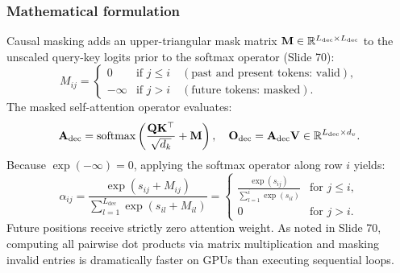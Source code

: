 \documentclass[../../main.tex]{subfiles}
\begin{document}
\subsubsection{Mathematical formulation}
Causal masking adds an upper-triangular mask matrix $\mathbf{M} \in \mathbb{R}^{L_{\text{dec}} \times L_{\text{dec}}}$ to the unscaled query-key logits prior to the softmax operator (Slide 70):
\begin{equation}
\label{eq:causal_mask_matrix_def}
M_{ij} = \begin{cases}
0 & \text{if } j \le i \quad (\text{past and present tokens: valid}), \\
-\infty & \text{if } j > i \quad (\text{future tokens: masked}).
\end{cases}
\end{equation}
The masked self-attention operator evaluates:
\begin{equation}
\label{eq:masked_attention_formula}
\mathbf{A}_{\text{dec}} = \operatorname{\mathrm{softmax}}\left( \frac{\mathbf{Q} \mathbf{K}^\top}{\sqrt{d_k}} + \mathbf{M} \right), \quad \mathbf{O}_{\text{dec}} = \mathbf{A}_{\text{dec}} \mathbf{V} \in \mathbb{R}^{L_{\text{dec}} \times d_v}.
\end{equation}
Because $\exp(-\infty) = 0$, applying the softmax operator along row $i$ yields:
\begin{equation}
\alpha_{ij} = \frac{\exp(s_{ij} + M_{ij})}{\sum_{l=1}^{L_{\text{dec}}} \exp(s_{il} + M_{il})} = \begin{cases}
\frac{\exp(s_{ij})}{\sum_{l=1}^i \exp(s_{il})} & \text{for } j \le i, \\
0 & \text{for } j > i.
\end{cases}
\end{equation}
Future positions receive strictly zero attention weight. As noted in Slide 70, computing all pairwise dot products via matrix multiplication and masking invalid entries is dramatically faster on GPUs than executing sequential loops.
\end{document}
